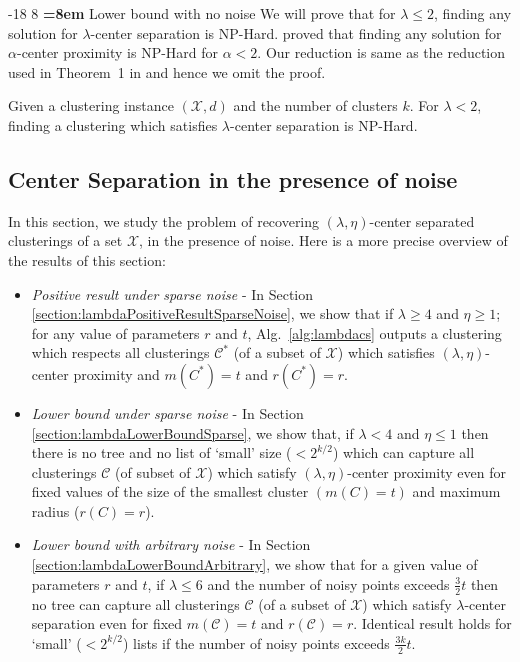 \documentclass[orivec]{llncs}
\makeatletter
\newcommand{\mc}{\mathcal}
\renewcommand\subsubsection{\@startsection{subsubsection}{3}{\z@}%
   {-18\p@ \@plus -4\p@ \@minus -4\p@}%
   {8\p@ \@plus 4\p@ \@minus 4\p@}%
   {\normalfont\normalsize\bfseries\boldmath
   \rightskip=\z@ \@plus 8em \pretolerance=10000}}
\makeatother
\begin{document}

\subsubsection{Lower bound with no noise}
\label{section:lowerBdNoNoiseLambda}
We will prove that for $\lambda \le 2$, finding any solution for $\lambda$-center separation is NP-Hard. \cite{reyzin2012data} proved that finding any solution for $\alpha$-center proximity is NP-Hard for $\alpha < 2$. Our reduction is same as the reduction used in Theorem~1 in \cite{reyzin2012data} and hence we omit the proof.

\begin{theorem}
\label{thm:lambdaNoNoiseLowerBd}
Given a clustering instance $(\mc X, d)$ and the number of clusters $k$. For $\lambda < 2$, finding a clustering which satisfies $\lambda$-center separation is NP-Hard.
\end{theorem}

\subsection{Center Separation in the presence of noise}
\label{sec:cswith}
In this section, we study the problem of recovering $(\lambda, \eta)$-center separated clusterings of a set $\mc X$, in the presence of noise. Here is a more precise overview of the results of this section:
\begin{itemize}[nolistsep,noitemsep,leftmargin=*]
\item  {\it Positive result under sparse noise} - In Section \ref{section:lambdaPositiveResultSparseNoise}, we show that if $\lambda \ge 4$ and $\eta \ge 1$; for any value of parameters $r$ and $t$, Alg.~\ref{alg:lambdacs} outputs a clustering which respects all clusterings $\mc C^*$ (of a subset of $\mc X$) which satisfies $(\lambda, \eta)$-center proximity and $m(C^*)=t$ and $r(C^*) = r$.
\item  {\it Lower bound under sparse noise} - In Section \ref{section:lambdaLowerBoundSparse}, we show that, if $\lambda < 4$ and $\eta \le 1$ then there is no tree and no list of `small' size ($<2^{k/2}$) which can capture all clusterings $\mc C$ (of subset of $\mc X$) which satisfy $(\lambda, \eta)$-center proximity even for fixed values of the size of the smallest cluster $(m(C) = t)$ and maximum radius ($r(C) = r$).
\item {\it Lower bound with arbitrary noise} - In Section \ref{section:lambdaLowerBoundArbitrary}, we show that for a given value of parameters $r$ and $t$, if $\lambda \le 6$ and the number of noisy points exceeds $\frac{3}{2}t$ then no tree can capture all clusterings $\mc C$ (of a subset of $\mc X$) which satisfy $\lambda$-center separation even for fixed $m(\mc C) = t$ and $r(\mc C) = r$. Identical result holds for `small' ($<2^{k/2}$) lists if the number of noisy points exceeds $\frac{3k}{2}t$.
\end{itemize}
\end{document}

